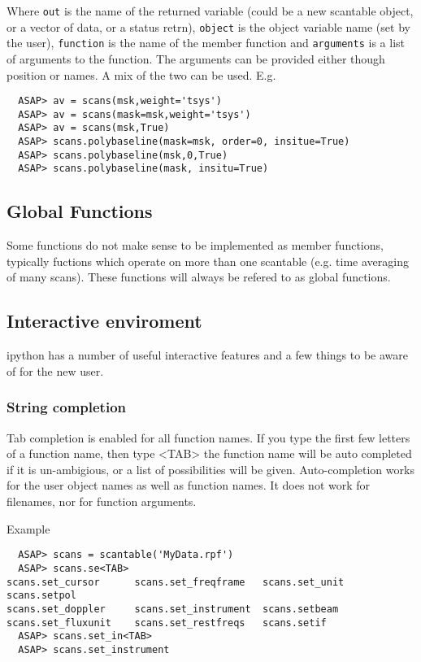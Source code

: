 \documentclass[11pt]{article}
\newcommand{\cmd}[1]{{\tt #1}}
\begin{document}
Where \cmd{out} is the name of the returned variable (could be a new
scantable object, or a vector of data, or a status retrn),  \cmd{object} is the
object variable name (set by the user), \cmd{function} is the name of
the member function and \cmd{arguments} is a list of arguments to the
function. The arguments can be provided either though position or names.
A mix of the two can be used.  E.g. 

\begin{verbatim}
  ASAP> av = scans(msk,weight='tsys')
  ASAP> av = scans(mask=msk,weight='tsys')
  ASAP> av = scans(msk,True)
  ASAP> scans.polybaseline(mask=msk, order=0, insitue=True)
  ASAP> scans.polybaseline(msk,0,True)
  ASAP> scans.polybaseline(mask, insitu=True)
\end{verbatim}

\subsection{Global Functions}

Some functions do not make sense to be implemented as member
functions, typically fuctions which operate on more than one scantable
(e.g. time averaging of many scans). These functions will always be
refered to as global functions.

\subsection{Interactive enviroment}

ipython has a number of useful interactive features and a few things to be aware
of for the new user.

\subsubsection{String completion}

Tab completion is enabled for all function names. If you type the
first few letters of a function name, then type <TAB> the function
name will be auto completed if it is un-ambigious, or a list of
possibilities will be given. Auto-completion works for the user
object names as well as function names. It does not work for filenames,
nor for function arguments.

Example
\begin{verbatim}
  ASAP> scans = scantable('MyData.rpf')
  ASAP> scans.se<TAB>
scans.set_cursor      scans.set_freqframe   scans.set_unit        scans.setpol
scans.set_doppler     scans.set_instrument  scans.setbeam         
scans.set_fluxunit    scans.set_restfreqs   scans.setif     
  ASAP> scans.set_in<TAB>
  ASAP> scans.set_instrument
\end{verbatim}
\end{document}

